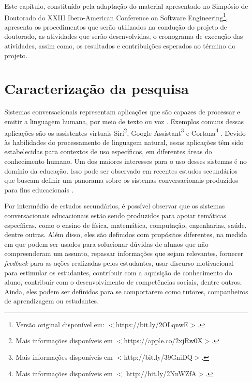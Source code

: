 \noindent Este capítulo, constituído pela adaptação do material apresentado no Simpósio de Doutorado do XXIII Ibero-American Conference on Software Engineering\footnote{Versão original disponível em: $<$https://bit.ly/2OLqnwE$>$.}, apresenta os procedimentos que serão utilizados na condução do projeto de doutorado, as atividades que serão desenvolvidas, o cronograma de execução das atividades, assim como, os resultados e contribuições esperados ao término do projeto.


\section{Caracterização da pesquisa}

Sistemas conversacionais representam aplicações que são capazes de processar e emitir a linguagem humana, por meio de texto ou voz \cite{abdul2015survey}. Exemplos comuns dessas aplicações são os assistentes virtuais Siri\footnote{Mais informações disponíveis em $<$https://apple.co/2xjRw0X$>$.}, Google Assistant\footnote{Mais informações disponíveis em $<$http://bit.ly/39GniDQ$>$.} e Cortana\footnote{Mais informações disponíveis em $<$ http://bit.ly/2NnWZfA$>$.} \cite{Laranjo:2018}. Devido às habilidades do processamento de linguagem natural, essas aplicações têm sido estabelecidas para contextos de uso específicos, em diferentes áreas do conhecimento humano. Um dos maiores interesses para o uso desses sistemas é no domínio da educação. Isso pode ser observado em recentes estudos secundários que buscam definir um panorama sobre os sistemas conversacionais produzidos para fins educacionais \cite{hobert2019,io2017}. 

Por intermédio de estudos secundários, é possível observar que os sistemas conversacionais educacionais estão sendo produzidos para apoiar temáticas específicas, como o ensino de física, matemática, computação, engenharias, saúde, dentre outras. Além disso, eles são definidos com propósitos diferentes, na medida em que podem ser usados para solucionar dúvidas de alunos que não compreenderam um assunto, repassar informações que sejam relevantes, fornecer \textit{feedback} para as ações realizadas pelos estudantes, usar discurso motivacional para estimular os estudantes, contribuir com a aquisição de conhecimento do aluno, contribuir com o desenvolvimento de competências sociais, dentre outros. Ainda, eles podem ser definidos para se comportarem como tutores, companheiros de aprendizagem ou estudantes. 

